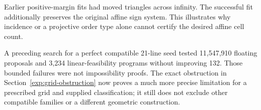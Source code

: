 Earlier positive-margin fits had moved triangles across infinity.
The successful fit additionally preserves the original affine sign
system. This illustrates why incidence or a projective order type alone
cannot certify the desired affine cell count.

A preceding search for a perfect compatible 21-line seed tested
11,547,910 floating proposals and 3,234 linear-feasibility programs
without improving 132. Those bounded failures were not impossibility
proofs. The exact obstruction in Section~\ref{exp:grid-obstruction}
now proves a much more precise limitation for a prescribed grid and
supplied classification; it still does not exclude other compatible
families or a different geometric construction.
